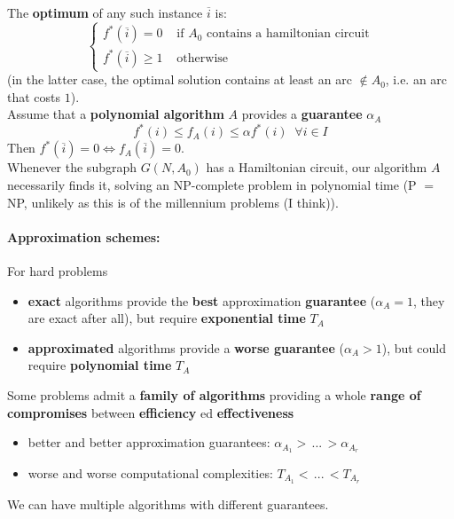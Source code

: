 The \textbf{optimum} of any such instance $\overline{i}$ is:
\begin{displaymath}
	\begin{cases}
		f^\ast (\overline{i}) = 0 & \text{ if } A_0 \text{ contains a hamiltonian circuit} \\
		f^\ast (\overline{i}) \geq 1 & \text{ otherwise}
	\end{cases}
\end{displaymath}
(in the latter case, the optimal solution contains at least an arc $\notin A_0$, i.e. an arc that costs $1$).\\

Assume that a \textbf{polynomial algorithm} $A$ provides a \textbf{guarantee} $\alpha_A$
$$ f^\ast (i) \leq f_A (i) \leq \alpha f^\ast (i) \;\; \forall i \in I $$
Then $f^\ast (\overline{i}) = 0 \Leftrightarrow f_A (\overline{i}) = 0$.\\

Whenever the subgraph $G (N, A_0)$ has a Hamiltonian circuit, our algorithm $A$ necessarily finds it, solving an NP-complete problem in polynomial time (P $=$ NP, unlikely as this is of the millennium problems (I think)).\\

\newpage

\paragraph{Approximation schemes:} For hard problems
\begin{itemize}
	\item \textbf{exact} algorithms provide the \textbf{best} approximation \textbf{guarantee} ($\alpha_A = 1$, they are exact after all), but require \textbf{exponential time} $T_A$
	\item \textbf{approximated} algorithms provide a \textbf{worse guarantee} ($\alpha_A > 1$), but could require \textbf{polynomial time} $T_A$
\end{itemize}

Some problems admit a \textbf{family of algorithms} providing a whole \textbf{range of compromises} between \textbf{efficiency} ed \textbf{effectiveness}
\begin{itemize}
	\item better and better approximation guarantees: $\alpha_{A_1} > \, ... \, > \alpha_{A_r}$
	\item worse and worse computational complexities: $T_{A_1} < \, ... \, < T_{A_r}$
\end{itemize}
We can have multiple algorithms with different guarantees.\\

